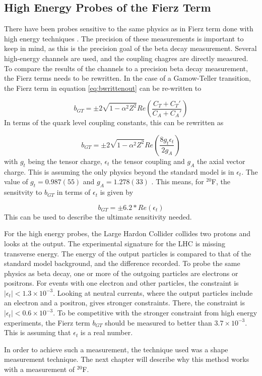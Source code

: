 \documentclass[../MaxHughesThesis.tex]{subfiles}
\begin{document}
\subsection{High Energy Probes of the Fierz Term}

There have been probes sensitive to the same physics as in Fierz term done with high energy techniques \cite{Gon19}.
The precision of these measurements is important to keep in mind, as this is the precision goal of the beta decay measurement.
Several high-energy channels are used, and the coupling chagres are directly measured.
To compare the results of the channels to a precision beta decay measurement, the Fierz terms needs to be rewritten.
In the case of a Gamow-Teller transition, the Fierz term in equation \ref{eq:bwrittenout} can be re-written to %

\begin{equation}
	b_{GT} = \pm 2 \sqrt{1 - \alpha^{2} Z^{2}} Re(\frac{C_{T} + C_{T}'}{C_{A} + C_{A}'})
	\label{eq:bgt}
\end{equation}
In terms of the quark level coupling constants, this can be rewritten as \cite{Gon19} %

\begin{equation}
	b_{GT} = \pm 2 \sqrt{1 - \alpha^{2} Z^{2}} Re(\frac{8 g_{t} \epsilon_{t}}{2 g_{A}})
	\label{eq:bgtquarklevel}
\end{equation}
with $g_{t}$ being the tensor charge, $\epsilon_{t}$ the tensor coupling and $g_{A}$ the axial vector charge.
This is assuming the only physics beyond the standard model is in $\epsilon_{t}$.
The value of $g_{t} = 0.987(55)$ and $g_{A} = 1.278 (33)$ \cite{Gon19}.
This means, for $^{20}$F, the sensitvity to $b_{GT}$ in terms of $\epsilon_{t}$ is given by %

\begin{equation}
	b_{GT} = \pm 6.2 * Re(\epsilon_{t})
	\label{eq:bgtpropor}
\end{equation}
This can be used to describe the ultimate sensitivity needed.

For the high energy probes, the Large Hardon Collider collides two protons and looks at the output. 
The experimental signature for the LHC is missing transverse energy.
The energy of the output particles is compared to that of the standard model background, and the difference recorded.
To probe the same physics as beta decay, one or more of the outgoing particles are electrons or positrons.
For events with one electron and other particles, the constraint is $|\epsilon_{t}| < 1.3 \times 10^{-3}$.
Looking at neutral currents, where the output particles include an electron and a positron, gives stronger constraints.
There, the constraint is $|\epsilon_{t}| < 0.6 \times 10^{-3}$.
To be competitive with the stronger constraint from high energy experiments, the Fierz term $b_{GT}$ should be measured to better than $3.7 \times 10^{-3}$. 
This is assuming that $\epsilon_{t}$ is a real number. 

In order to achieve such a measurement, the technique used was a shape measurement technique.
The next chapter will describe why this method works with a measurement of $^{20}$F.
\end{document}
